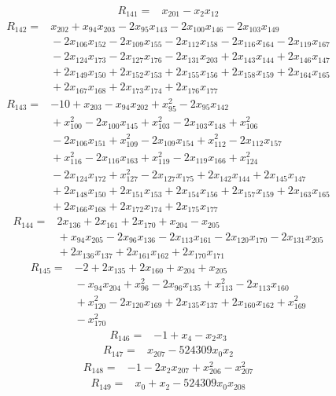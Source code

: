 \documentclass[11pt]{article}
\theoremstyle{definition}
\theoremstyle{remark}
\begin{document}
\begin{align*}
R_{141} ={}& x_{201} - x_{2} x_{12}
\end{align*}
\begin{align*}
R_{142} ={}& x_{202} + x_{94} x_{203} - 2x_{95} x_{143} - 2x_{100} x_{146} - 2x_{103} x_{149} \\
&{} -2x_{106} x_{152} - 2x_{109} x_{155} - 2x_{112} x_{158} - 2x_{116} x_{164} - 2x_{119} x_{167} \\
&{} -2x_{124} x_{173} - 2x_{127} x_{176} - 2x_{131} x_{203} + 2x_{143} x_{144} + 2x_{146} x_{147} \\
&{} + 2x_{149} x_{150} + 2x_{152} x_{153} + 2x_{155} x_{156} + 2x_{158} x_{159} + 2x_{164} x_{165} \\
&{} + 2x_{167} x_{168} + 2x_{173} x_{174} + 2x_{176} x_{177}
\end{align*}
\begin{align*}
R_{143} ={}& -10 + x_{203} - x_{94} x_{202} + x_{95}^{2} - 2x_{95} x_{142} \\
&{} + x_{100}^{2} - 2x_{100} x_{145} + x_{103}^{2} - 2x_{103} x_{148} + x_{106}^{2} \\
&{} -2x_{106} x_{151} + x_{109}^{2} - 2x_{109} x_{154} + x_{112}^{2} - 2x_{112} x_{157} \\
&{} + x_{116}^{2} - 2x_{116} x_{163} + x_{119}^{2} - 2x_{119} x_{166} + x_{124}^{2} \\
&{} -2x_{124} x_{172} + x_{127}^{2} - 2x_{127} x_{175} + 2x_{142} x_{144} + 2x_{145} x_{147} \\
&{} + 2x_{148} x_{150} + 2x_{151} x_{153} + 2x_{154} x_{156} + 2x_{157} x_{159} + 2x_{163} x_{165} \\
&{} + 2x_{166} x_{168} + 2x_{172} x_{174} + 2x_{175} x_{177}
\end{align*}
\begin{align*}
R_{144} ={}& 2x_{136} + 2x_{161} + 2x_{170} + x_{204} - x_{205} \\
&{} + x_{94} x_{205} - 2x_{96} x_{136} - 2x_{113} x_{161} - 2x_{120} x_{170} - 2x_{131} x_{205} \\
&{} + 2x_{136} x_{137} + 2x_{161} x_{162} + 2x_{170} x_{171}
\end{align*}
\begin{align*}
R_{145} ={}& -2 + 2x_{135} + 2x_{160} + x_{204} + x_{205} \\
&{} -x_{94} x_{204} + x_{96}^{2} - 2x_{96} x_{135} + x_{113}^{2} - 2x_{113} x_{160} \\
&{} + x_{120}^{2} - 2x_{120} x_{169} + 2x_{135} x_{137} + 2x_{160} x_{162} + x_{169}^{2} \\
&{} -x_{170}^{2}
\end{align*}
\begin{align*}
R_{146} ={}& -1 + x_{4} - x_{2} x_{3}
\end{align*}
\begin{align*}
R_{147} ={}& x_{207} - 524309x_{0} x_{2}
\end{align*}
\begin{align*}
R_{148} ={}& -1 - 2x_{2} x_{207} + x_{206}^{2} - x_{207}^{2}
\end{align*}
\begin{align*}
R_{149} ={}& x_{0} + x_{2} - 524309x_{0} x_{208}
\end{align*}
\endgroup
\end{document}
